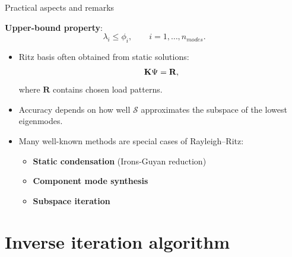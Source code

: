 \documentclass[aspectratio=169]{beamer}
\begin{document}
\begin{frame}{Practical aspects and remarks}
  \begin{tcolorbox}[colback=darkred!10,colframe=darkred!40!black]
    \textbf{Upper-bound property}:
    \[
      \lambda_i \le \phi_i , \qquad i=1,\dots,n_{modes} .
    \]
  \end{tcolorbox}
  \begin{itemize}
    \item Ritz basis often obtained from static solutions:
          \[
            \mathbf K \mathbf \mathbf \Psi = \mathbf R,
          \]
          where $\mathbf R$ contains chosen load patterns.
    \item Accuracy depends on how well $\mathcal S$ approximates the
          subspace of the lowest eigenmodes.
    \item Many well-known methods are special cases of Rayleigh--Ritz:
          \begin{itemize}
            \item \textbf{Static condensation} (Irons-Guyan reduction)
            \item \textbf{Component mode synthesis}
            \item \textbf{Subspace iteration}
          \end{itemize}
  \end{itemize}
\end{frame}


\section{Inverse iteration algorithm}
\end{document}
